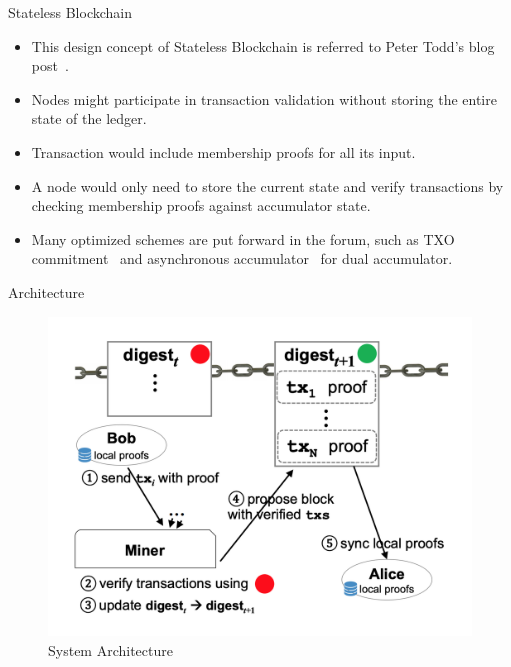 \documentclass[biblatex,aspectratio=169,11pt]{mybeamer}
\begin{document}
\begin{frame}{Stateless Blockchain}
  \begin{itemize}
   \item This design concept of \alert{Stateless Blockchain} is referred to Peter Todd's blog post~\cite{Tod}. 
   \item Nodes might participate in transaction validation without storing the entire state of the ledger.
   \item Transaction would include membership proofs for all its input.
   \item A node would only need to store the current state and verify transactions by checking membership proofs against accumulator state.
   \item Many optimized schemes are put forward in the forum, such as TXO commitment~\cite{MMR} and asynchronous accumulator~\cite{reyzin2016efficient} for dual accumulator.
 \end{itemize}
\end{frame}

\begin{frame}{Architecture}
  \begin{figure}
    \includegraphics[width=0.6\linewidth]{figs/Edrax-arch.png}
    \caption{System Architecture}
  \end{figure}
\end{frame}

\subsection{}
\end{document}
